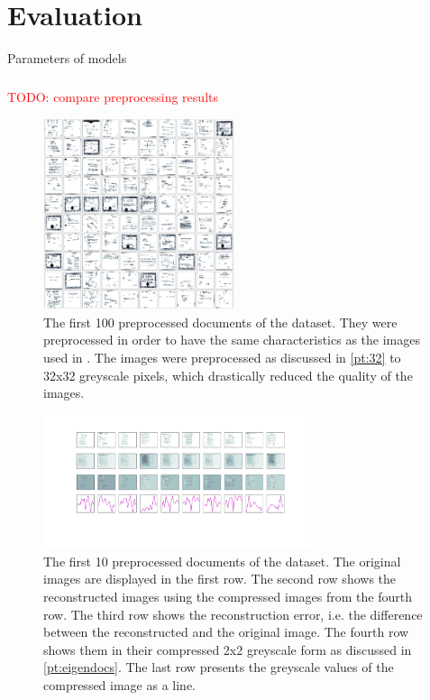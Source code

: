 \chapter{Evaluation}\label{ch:evaluation}
Parameters of models

\subsection{\eigendocs}\label{subsec:evaluation-eigendocs}

\textcolor{red}{TODO: compare preprocessing results}


\begin{figure}[htp] %
    \centering
    \includegraphics[width=0.5\textwidth]{images/OPTICS/32x32/preprocessed_docs.pdf}
    \caption{The first 100 preprocessed documents of the dataset.
    They were preprocessed in order to have the same characteristics as the images used in \cite{OPTICS1999}.
    The images were preprocessed as discussed in \autoref{pt:32} to 32x32 greyscale pixels, which drastically reduced the quality of the images.
    }
    \label{fig:preprocessed_docs_32x32}
\end{figure}

\begin{figure}[htp] %
    \centering
    \includegraphics[width=0.7\textwidth]{images/Eigendocs/transformation/eigendocs_13dims.pdf}
    \caption{The first 10 preprocessed documents of the dataset.
    The original images are displayed in the first row.
    The second row shows the reconstructed images using the compressed images from the fourth row.
    The third row shows the reconstruction error, i.e. the difference between the reconstructed and the original image.
    The fourth row shows them in their compressed 2x2 greyscale form as discussed in \autoref{pt:eigendocs}.
    The last row presents the greyscale values of the compressed image as a line.
    }
    \label{fig:preprocessed_docs_eigendocs}
\end{figure}


